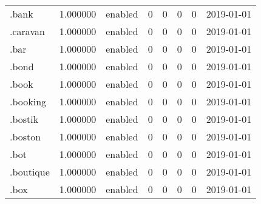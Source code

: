 \begin{tabular}{lrlrrrrl}
.bank                     &          1.000000 &         enabled &                           0 &                           0 &                           0 &                   0 &           2019-01-01 \\
.caravan                  &          1.000000 &         enabled &                           0 &                           0 &                           0 &                   0 &           2019-01-01 \\
.bar                      &          1.000000 &         enabled &                           0 &                           0 &                           0 &                   0 &           2019-01-01 \\
.bond                     &          1.000000 &         enabled &                           0 &                           0 &                           0 &                   0 &           2019-01-01 \\
.book                     &          1.000000 &         enabled &                           0 &                           0 &                           0 &                   0 &           2019-01-01 \\
.booking                  &          1.000000 &         enabled &                           0 &                           0 &                           0 &                   0 &           2019-01-01 \\
.bostik                   &          1.000000 &         enabled &                           0 &                           0 &                           0 &                   0 &           2019-01-01 \\
.boston                   &          1.000000 &         enabled &                           0 &                           0 &                           0 &                   0 &           2019-01-01 \\
.bot                      &          1.000000 &         enabled &                           0 &                           0 &                           0 &                   0 &           2019-01-01 \\
.boutique                 &          1.000000 &         enabled &                           0 &                           0 &                           0 &                   0 &           2019-01-01 \\
.box                      &          1.000000 &         enabled &                           0 &                           0 &                           0 &                   0 &           2019-01-01 \\

\end{tabular}
